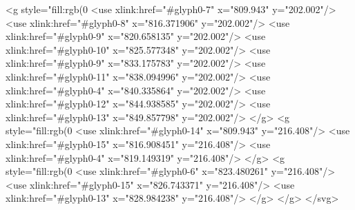 <g style="fill:rgb(0%
  <use xlink:href="#glyph0-7" x="809.943" y="202.002"/>
  <use xlink:href="#glyph0-8" x="816.371906" y="202.002"/>
  <use xlink:href="#glyph0-9" x="820.658135" y="202.002"/>
  <use xlink:href="#glyph0-10" x="825.577348" y="202.002"/>
  <use xlink:href="#glyph0-9" x="833.175783" y="202.002"/>
  <use xlink:href="#glyph0-11" x="838.094996" y="202.002"/>
  <use xlink:href="#glyph0-4" x="840.335864" y="202.002"/>
  <use xlink:href="#glyph0-12" x="844.938585" y="202.002"/>
  <use xlink:href="#glyph0-13" x="849.857798" y="202.002"/>
</g>
<g style="fill:rgb(0%
  <use xlink:href="#glyph0-14" x="809.943" y="216.408"/>
  <use xlink:href="#glyph0-15" x="816.908451" y="216.408"/>
  <use xlink:href="#glyph0-4" x="819.149319" y="216.408"/>
</g>
<g style="fill:rgb(0%
  <use xlink:href="#glyph0-6" x="823.480261" y="216.408"/>
  <use xlink:href="#glyph0-15" x="826.743371" y="216.408"/>
  <use xlink:href="#glyph0-13" x="828.984238" y="216.408"/>
</g>
</g>
</svg>
